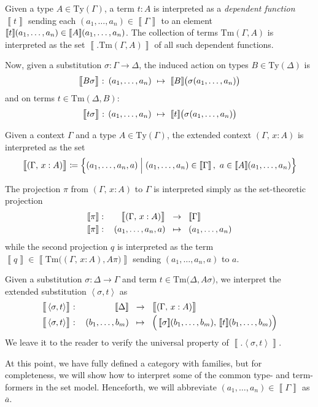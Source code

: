 \documentclass{article}
\theoremstyle{definition}
\renewcommand{\int}[1]
    {\left\llbracket #1 \right\rrbracket}       %
\newcommand{\substType}[2]{#2#1}%
\newcommand{\substTerm}[2]{#2#1}%
\newcommand{\extsub}[2]{\ang{#1,#2}}
\newcommand{\Ty}{\mathrm{Ty}}
\newcommand{\Tm}{\mathrm{Tm}}
\newcommand{\defeq}{
	\mathrel{\mathrel{\mathop:}\mkern-1.2mu=}}	%
\newcommand{\tup}[1]{\overline{#1}}
\newcommand{\ang}[1]{\left\langle #1 \right\rangle}
\newcommand{\n}{\hspace{-0.2em}}                %
\begin{document}
Given a type $A \in \Ty(\Gamma)$, a term $t : A$ is interpreted as a \textit{dependent function} $\int{t}$ sending each $(a_1,\ldots,a_n) \in \int{\Gamma}$ to an element $\int{t}\n(a_1,\ldots,a_n) \in \int{A}\n(a_1,\ldots,a_n)$. The collection of terms $\Tm(\Gamma,A)$ is interpreted as the set $\int{\big.\Tm(\Gamma,A)}$ of all such dependent functions.

Now, given a substitution $\sigma\colon \Gamma \to \Delta$, the induced action on types $B \in \Ty(\Delta)$ is $$\int{\big.\substType{\sigma}{B}}\colon\, (a_1,\ldots,a_n)\ \mapsto\ \int{B}\n\big( \sigma(a_1,\ldots,a_n) \big)$$
and on terms $t \in \Tm(\Delta,B)$:
$$\int{\big.\substTerm{\sigma}{t}} :\, (a_1,\ldots,a_n)\ \mapsto\ \int{t}\n\big( \sigma(a_1,\ldots,a_n) \big)$$

Given a context $\Gamma$ and a type $A \in \Ty(\Gamma)$, the extended context $(\Gamma,\, x : A)$ is interpreted as the set
$$\int{\big.(\Gamma,\, x : A)} \defeq \Big\{ (a_1,\ldots,a_n,a) \mathrel{\Big|} (a_1,\ldots,a_n) \in \int{\Gamma},\ a \in \int{A}\n(a_1,\ldots,a_n) \Big\}$$

The projection $\pi$ from $(\Gamma,\, x : A)$ to $\Gamma$ is interpreted simply as the set-theoretic projection
$$\arraycolsep=1.5mm
\begin{array}{rrcl}
    \int{\pi}\colon& \int{\big.(\Gamma,\, x : A)} &\to& \int{\Gamma}\\[1mm]
    \int{\pi}\colon& (a_1,\ldots,a_n,a) &\mapsto& (a_1,\ldots,a_n)
\end{array}$$
while the second projection $q$ is interpreted as the term $\int{q} \in \int{\Tm \big( (\Gamma,\, x : A), \substType{\pi}{A} \big)}$ sending $(a_1,\ldots,a_n,a)$ to $a$.

Given a substitution $\sigma\colon \Delta \to \Gamma$ and term $t \in \Tm \big( \Delta, \substType{\sigma}{A} \big)$, we interpret the extended substitution $\extsub{\sigma}{t}$ as
$$\arraycolsep=1.5mm
\begin{array}{rrcl}
    \int{\big.\extsub{\sigma}{t}}\colon& \int{\Delta} &\to& \int{\big.(\Gamma,\, x : A)} \\[1mm]
    \int{\big.\extsub{\sigma}{t}}\colon& (b_1,\ldots,b_m) &\mapsto& \Big( \int{\sigma}\n(b_1,\ldots,b_m),\, \int{t}\n(b_1,\ldots,b_m) \Big)
\end{array}$$
We leave it to the reader to verify the universal property of $\int{\big.\extsub{\sigma}{t}}$.

At this point, we have fully defined a category with families, but for completeness, we will show how to interpret some of the common type- and term-formers in the set model. Henceforth, we will abbreviate $(a_1,\ldots,a_n) \in \int{\Gamma}$ as $\tup{a}$.
\end{document}

